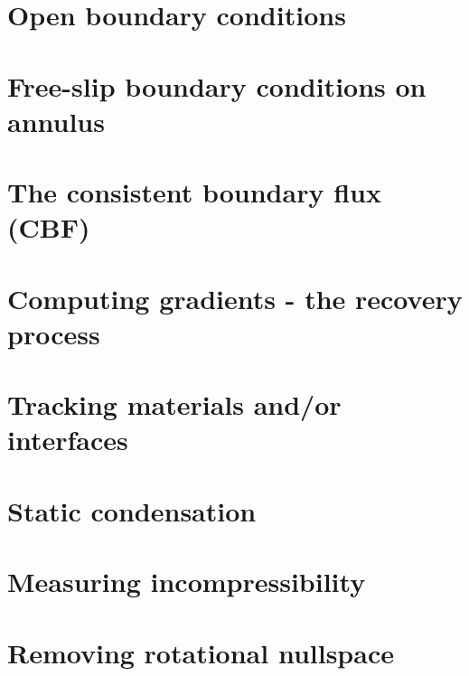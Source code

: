 \section{Open boundary conditions}\label{ss:openbc} %
\newpage %
\section{Free-slip boundary conditions on annulus}\label{ss:fsbc_annulus} %
\newpage %
\section{The consistent boundary flux (CBF) \label{ss:cbf}}  %
\newpage %
\section{Computing gradients - the recovery process}  %
\newpage %
\section{Tracking materials and/or interfaces}  %
\newpage %
\section{Static condensation}  %
\newpage %
\section{Measuring incompressibility \label{ss_incomp}}  %
\newpage %
\section{Removing rotational nullspace\label{ss_nullspace}}  %
\newpage %
